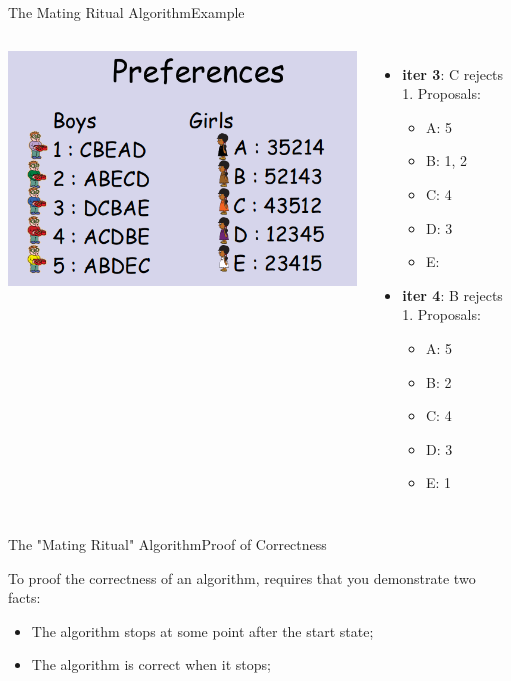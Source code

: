 \begin{frame}{The Mating Ritual Algorithm}{Example}

  \begin{columns}
    \includegraphics[width=1\textwidth]{../img/marriage2}
    {\large
      \begin{itemize}
      \item {\bf iter 3}: C rejects 1. Proposals:
        \begin{itemize}
        \item A: 5
        \item B: 1, 2
        \item C: 4
        \item D: 3
        \item E:
        \end{itemize}

      \item {\bf iter 4}: B rejects 1. Proposals:
        \begin{itemize}
        \item A: 5
        \item B: 2
        \item C: 4
        \item D: 3
        \item E: 1
        \end{itemize}
      \end{itemize}
    }
  \end{columns}
\end{frame}

\begin{frame}{The "Mating Ritual" Algorithm}{Proof of Correctness}

  {\larger
  To proof the correctness of an algorithm, requires that you demonstrate two facts:

    \begin{itemize}
    \item The algorithm stops at some point after the start state;

      \bigskip

    \item The algorithm is correct when it stops;
    \end{itemize}
  }
\end{frame}

